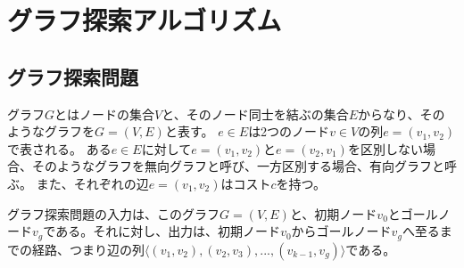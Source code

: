 \documentclass[a4paper,11pt,oneside,openany]{jsbook}
\begin{document}



\section{グラフ探索アルゴリズム}
\subsection{グラフ探索問題}
グラフ$G$とはノードの集合$V$と、そのノード同士を結ぶの集合$E$からなり、そのようなグラフを$G=(V,E)$と表す。
$e \in E$は2つのノード$v \in V$の列$e = (v_{1}, v_{2})$で表される。
ある$e \in E$に対して$e = (v_{1}, v_{2})$と$e = (v_{2}, v_{1})$を区別しない場合、そのようなグラフを無向グラフと呼び、一方区別する場合、有向グラフと呼ぶ。
また、それぞれの辺$e = (v_{1}, v_{2})$はコスト$c$を持つ。

グラフ探索問題の入力は、このグラフ$G=(V,E)$と、初期ノード$v_0$とゴールノード$v_g$である。それに対し、出力は、初期ノード$v_0$からゴールノード$v_g$へ至るまでの経路、つまり辺の列$\langle(v_{1}, v_{2}), (v_{2}, v_{3}), ...,(v_{k-1}, v_{g}) \rangle$である。
\end{document}

